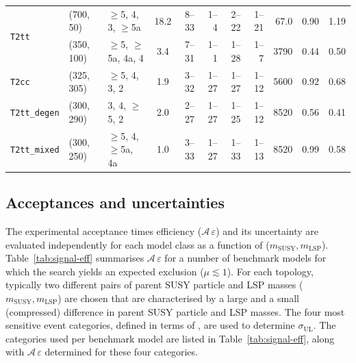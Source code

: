 \begin{table}[!t]
{\begin{tabular}{ lllcrrrrrcc }
      \multirow{2}{*}{\texttt{T2tt}}                      
 & (700, 50)   & $\geq$5, 4, 3, $\geq$5a  & 18.2           & 8--33  & 1--4    & 2--22 & 1--21 & 67.0 & 0.90 & 1.19 \\
 & (350, 100)  & $\geq$5, $\geq$5a, 4a, 4 & \phantom{1}3.4 & 7--31  & 1--1    & 1--28 & 1--7  & 3790 & 0.44 & 0.50 \\ [0.5ex]
      \multirow{1}{*}{\texttt{T2cc}}                      
 & (325, 305)  & $\geq$5, 4, 3, 2         & \phantom{1}1.9 & 3--32  & 1--27   & 1--27 & 1--12 & 5600 & 0.92 & 0.68 \\ [0.5ex]
      \multirow{1}{*}{\texttt{T2tt\_degen}}               
 & (300, 290)  & 3, 4, $\geq$5, 2         & \phantom{1}2.0 & 2--27  & 1--27   & 1--25 & 1--12 & 8520 & 0.56 & 0.41 \\ [0.5ex]
      \multirow{1}{*}{\texttt{T2tt\_mixed}}               
 & (300, 250)  & $\geq$5, 4, $\geq$5a, 4a & \phantom{1}1.0 & 3--33  & 1--27   & 1--33 & 1--13 & 8520 & 0.99 & 0.58 \\ [0.5ex]
      \hline
    \end{tabular}
  }
\end{table}

\subsection{Acceptances and uncertainties}

The experimental acceptance times efficiency
($\mathcal{A}\,\varepsilon$) and its uncertainty are evaluated
independently for each model class as a function of ($m_\text{SUSY},
m_\text{LSP}$). Table~\ref{tab:signal-eff} summarises
$\mathcal{A}\,\varepsilon$ for a number of benchmark models for
which the search yields an expected exclusion ($\mu \lesssim 1$). For
each topology, typically two different pairs of parent SUSY particle and
LSP masses ($m_\text{SUSY}, m_\text{LSP}$) are chosen that are
characterised by a large and a small (\ie compressed) difference
in parent SUSY particle and LSP masses. The four most sensitive event
categories, defined in terms of \njet, are used to determine
$\sigma_\text{UL}$. The categories used per benchmark model are listed
in Table~\ref{tab:signal-eff}, along with
$\mathcal{A}\,\varepsilon$ determined for these four categories.

